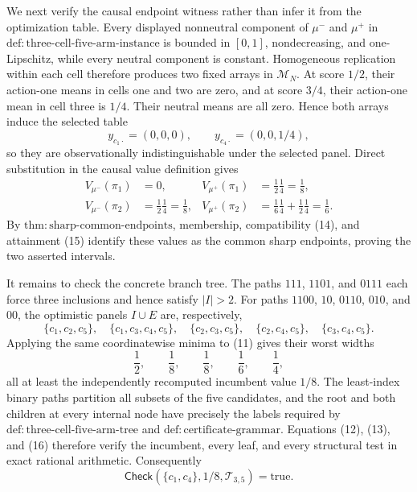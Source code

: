 We next verify the causal endpoint witness rather than infer it from the
optimization table.  Every displayed nonneutral component of
\(\mu^-\) and \(\mu^+\) in
\(\mathrm{def{:}three\text{-}cell\text{-}five\text{-}arm\text{-}instance}\)
is bounded in \([0,1]\), nondecreasing, and one-Lipschitz, while every
neutral component is constant.  Homogeneous replication within each cell
therefore produces two fixed arrays in \(\mathcal M_N\).  At score
\(1/2\), their action-one means in cells one and two are zero, and at score
\(3/4\), their action-one mean in cell three is \(1/4\).  Their neutral
means are all zero.  Hence both arrays induce the selected table
\[
y_{c_1\cdot}=(0,0,0),
\qquad
y_{c_4\cdot}=(0,0,1/4),                                                \tag{14}
\]
so they are observationally indistinguishable under the selected panel.
Direct substitution in the causal value definition gives
\[
\begin{aligned}
V_{\mu^-}(\pi_1)&=0,
&V_{\mu^+}(\pi_1)&=\frac12\frac14=\frac18,\\
V_{\mu^-}(\pi_2)&=\frac12\frac14=\frac18,
&V_{\mu^+}(\pi_2)&=\frac16\frac14+\frac12\frac14=\frac16.
                                                                            \tag{15}
\end{aligned}
\]
By \(\mathrm{thm{:}sharp\text{-}common\text{-}endpoints}\), membership,
compatibility (14), and attainment (15) identify these values as the common
sharp endpoints, proving the two asserted intervals.

It remains to check the concrete branch tree.  The paths \(111\),
\(1101\), and \(0111\) each force three inclusions and hence satisfy
\(|I|>2\).  For paths \(1100\), \(10\), \(0110\), \(010\), and \(00\),
the optimistic panels \(I\cup E\) are, respectively,
\[
\{c_1,c_2,c_5\},\quad
\{c_1,c_3,c_4,c_5\},\quad
\{c_2,c_3,c_5\},\quad
\{c_2,c_4,c_5\},\quad
\{c_3,c_4,c_5\}.
\]
Applying the same coordinatewise minima to (11) gives their worst widths
\[
\frac12,\qquad \frac18,\qquad \frac18,\qquad \frac16,
\qquad \frac14,                                                         \tag{16}
\]
all at least the independently recomputed incumbent value \(1/8\).  The
least-index binary paths partition all subsets of the five candidates, and
the root and both children at every internal node have precisely the labels
required by \(\mathrm{def{:}three\text{-}cell\text{-}five\text{-}arm\text{-}tree}\)
and \(\mathrm{def{:}certificate\text{-}grammar}\).  Equations (12), (13),
and (16) therefore verify the incumbent, every leaf, and every structural
test in exact rational arithmetic.  Consequently
\[
\mathsf{Check}(\{c_1,c_4\},1/8,\mathcal T_{3,5})=\mathrm{true}.
\]

